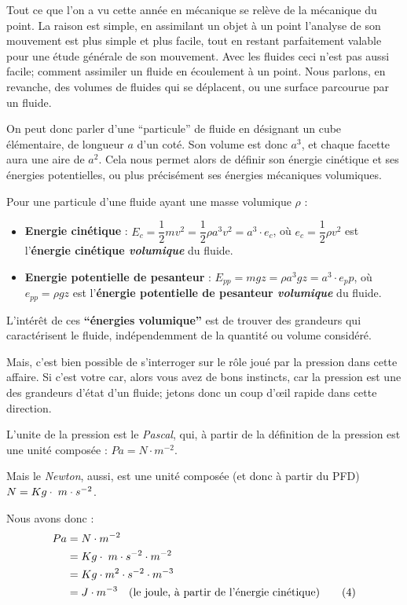 \documentclass[11pt,a4paper]{article}
\begin{document}
Tout ce que l'on a vu cette année en mécanique se relève de la mécanique du point. La raison est simple, en assimilant un objet à un point l'analyse de son mouvement est plus simple et plus facile, tout en restant parfaitement valable pour une étude générale de son mouvement. Avec les fluides ceci n'est pas aussi facile; comment assimiler un fluide en écoulement à un point. Nous parlons, en revanche, des volumes de fluides qui se déplacent, ou une surface parcourue par un fluide. 

On peut donc parler d'une ``particule'' de fluide en désignant un cube élémentaire, de longueur $a$ d'un coté. Son volume est donc $a^3$, et chaque facette aura une aire de $a^2$. Cela nous permet alors de définir son énergie cinétique et ses énergies potentielles, ou plus précisément ses énergies mécaniques volumiques. 

Pour une particule d'une fluide ayant une masse volumique $\rho$ : 
\begin{itemize}
    \item \textbf{Energie cinétique} : $E_c = \dfrac{1}{2}mv^2 = \dfrac{1}{2}\rho a^3 v^2 = a^3\cdot e_c$, où $e_c=\dfrac{1}{2}\rho v^2 $ est l'\textbf{énergie cinétique \textit{volumique}} du fluide. 
    \item \textbf{Energie potentielle de pesanteur} : $E_{pp} = mgz = \rho a^3 g z = a^3\cdot e_pp$, où $e_{pp} = \rho g z $ est l'\textbf{énergie potentielle de pesanteur \textit{volumique}} du fluide. 
\end{itemize}

L'intérêt de ces \textbf{``énergies volumique''} est de trouver des grandeurs qui caractérisent le fluide, indépendemment de la quantité ou volume considéré. 

Mais, c'est bien possible de s'interroger sur le rôle joué par la pression dans cette affaire. Si c'est votre car, alors vous avez de bons instincts, car la pression est une des grandeurs d'état d'un fluide; jetons donc un coup d'\oe il rapide dans cette direction. 

L'unite de la pression est le \textit{Pascal}, qui, à partir de la définition de la pression est une unité composée :  $Pa = N\cdot m^{-2}$. 

Mais le \textit{Newton}, aussi, est une unité composée (et donc à partir du PFD) $N = Kg\cdot \; m\cdot s^{-2}$. 

Nous avons donc : 
\begin{align*}
    Pa &= N\cdot m^{-2} \\
    &= Kg\cdot \; m\cdot s^{-2}\cdot m^{-2} \\
    &= Kg\cdot m^2 \cdot s^{-2}\cdot m^{-3} \\
    &= J\cdot m^{-3} \quad (\text{le joule, à partir de l'énergie cinétique)} \tag{4}
\end{align*}
\end{document}
